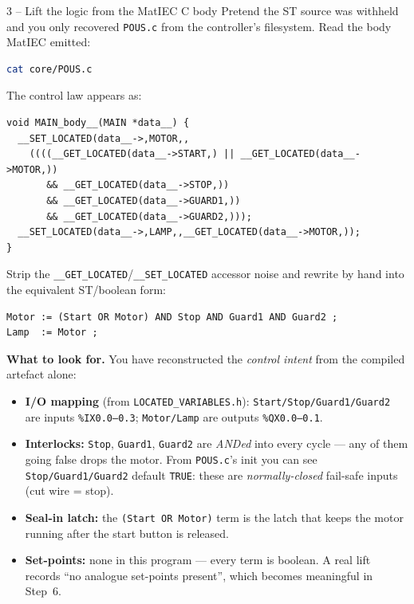 \documentclass[11pt,a4paper]{article}
\begin{document}
\begin{stepbox}{3 -- Lift the logic from the MatIEC C body}
Pretend the ST source was withheld and you only recovered \texttt{POUS.c}
from the controller's filesystem. Read the body MatIEC emitted:
\begin{lstlisting}[language=bash]
cat core/POUS.c
\end{lstlisting}
The control law appears as:
\begin{lstlisting}
void MAIN_body__(MAIN *data__) {
  __SET_LOCATED(data__->,MOTOR,,
    ((((__GET_LOCATED(data__->START,) || __GET_LOCATED(data__->MOTOR,))
       && __GET_LOCATED(data__->STOP,))
       && __GET_LOCATED(data__->GUARD1,))
       && __GET_LOCATED(data__->GUARD2,)));
  __SET_LOCATED(data__->,LAMP,,__GET_LOCATED(data__->MOTOR,));
}
\end{lstlisting}
Strip the \texttt{\_\_GET\_LOCATED}/\texttt{\_\_SET\_LOCATED} accessor noise
and rewrite by hand into the equivalent ST/boolean form:
\begin{lstlisting}
Motor := (Start OR Motor) AND Stop AND Guard1 AND Guard2 ;
Lamp  := Motor ;
\end{lstlisting}

\noindent\textbf{What to look for.} You have reconstructed the
\emph{control intent} from the compiled artefact alone:
\begin{itemize}\setlength{\itemsep}{1pt}
  \item \textbf{I/O mapping} (from \texttt{LOCATED\_VARIABLES.h}):
        \texttt{Start/Stop/Guard1/Guard2} are inputs \texttt{\%IX0.0--0.3};
        \texttt{Motor/Lamp} are outputs \texttt{\%QX0.0--0.1}.
  \item \textbf{Interlocks:} \texttt{Stop}, \texttt{Guard1}, \texttt{Guard2}
        are \emph{ANDed} into every cycle --- any of them going false drops
        the motor. From \texttt{POUS.c}'s init you can see
        \texttt{Stop/Guard1/Guard2} default \texttt{TRUE}: these are
        \emph{normally-closed} fail-safe inputs (cut wire = stop).
  \item \textbf{Seal-in latch:} the \texttt{(Start OR Motor)} term is the
        latch that keeps the motor running after the start button is
        released.
  \item \textbf{Set-points:} none in this program --- every term is boolean.
        A real lift records ``no analogue set-points present'', which
        becomes meaningful in Step~6.
\end{itemize}
\end{stepbox}
\end{document}
